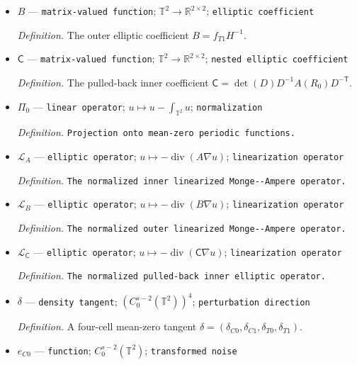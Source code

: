 \documentclass{article}
\begin{document}
\begin{itemize}
  \par\smallskip\noindent\emph{Definition.} The inner elliptic coefficient \(A=f_{C0}S^{-1}\).
  \item \(B\) --- \texttt{matrix-\allowbreak{}valued function}; \(\mathbb T^2\to\mathbb R^{2\times2}\); \texttt{elliptic coefficient}
  \par\smallskip\noindent\emph{Definition.} The outer elliptic coefficient \(B=f_{T1}H^{-1}\).
  \item \(\mathsf C\) --- \texttt{matrix-\allowbreak{}valued function}; \(\mathbb T^2\to\mathbb R^{2\times2}\); \texttt{nested elliptic coefficient}
  \par\smallskip\noindent\emph{Definition.} The pulled-back inner coefficient \(\mathsf C=\det(D)D^{-1}A(R_0)D^{-\mathsf T}\).
  \item \(\Pi_0\) --- \texttt{linear operator}; \(u\mapsto u-\int_{\mathbb T^2}u\); \texttt{normalization}
  \par\smallskip\noindent\emph{Definition.} \texttt{Projection onto mean-\allowbreak{}zero periodic functions.}
  \item \(\mathcal L_A\) --- \texttt{elliptic operator}; \(u\mapsto-\operatorname{div}(A\nabla u)\); \texttt{linearization operator}
  \par\smallskip\noindent\emph{Definition.} \texttt{The normalized inner linearized Monge-\allowbreak{}-\allowbreak{}Ampere operator.}
  \item \(\mathcal L_B\) --- \texttt{elliptic operator}; \(u\mapsto-\operatorname{div}(B\nabla u)\); \texttt{linearization operator}
  \par\smallskip\noindent\emph{Definition.} \texttt{The normalized outer linearized Monge-\allowbreak{}-\allowbreak{}Ampere operator.}
  \item \(\mathcal L_{\mathsf C}\) --- \texttt{elliptic operator}; \(u\mapsto-\operatorname{div}(\mathsf C\nabla u)\); \texttt{linearization operator}
  \par\smallskip\noindent\emph{Definition.} \texttt{The normalized pulled-\allowbreak{}back inner elliptic operator.}
  \item \(\delta\) --- \texttt{density tangent}; \((C_0^{s-2}(\mathbb T^2))^4\); \texttt{perturbation direction}
  \par\smallskip\noindent\emph{Definition.} A four-cell mean-zero tangent \(\delta=(\delta_{C0},\delta_{C1},\delta_{T0},\delta_{T1})\).
  \item \(e_{C0}\) --- \texttt{function}; \(C_0^{s-2}(\mathbb T^2)\); \texttt{transformed noise}

\end{itemize}
\end{document}
